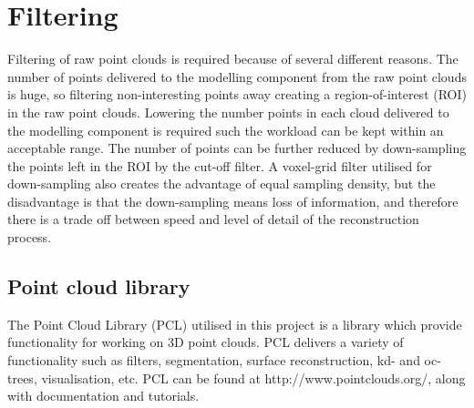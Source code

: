 \section{Filtering}
Filtering of raw point clouds is required because of several different reasons. The number of points delivered to the modelling component from the raw point clouds is huge, so filtering non-interesting points away creating a region-of-interest (ROI) in the raw point clouds. Lowering the number points in each cloud delivered to the modelling component is required such the workload can be kept within an acceptable range. The number of points can be further reduced by down-sampling the points left in the ROI by the cut-off filter. A voxel-grid filter utilised for down-sampling also creates the advantage of equal sampling density, but the disadvantage is that the down-sampling means loss of information, and therefore there is a trade off between speed and level of detail of the reconstruction process.

\subsection{Point cloud library}
The Point Cloud Library (PCL) utilised in this project is a library which provide functionality for working on 3D point clouds. PCL delivers a variety of functionality such as filters, segmentation, surface reconstruction, kd- and oc-trees, visualisation, etc. PCL can be found at http://www.pointclouds.org/, along with documentation and tutorials.

